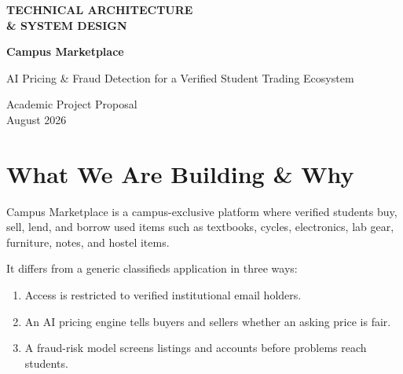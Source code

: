 \documentclass[11pt,a4paper]{article}
\begin{document}
\begin{titlepage}
    \centering
    \vspace*{2cm}
    {\Huge\bfseries\color{primary} TECHNICAL ARCHITECTURE\\[0.2cm]
    \& SYSTEM DESIGN\par}
    \vspace{1cm}
    {\LARGE\bfseries Campus Marketplace\par}
    \vspace{0.5cm}
    {\Large AI Pricing \& Fraud Detection for a Verified Student Trading Ecosystem\par}
    \vspace{1.2cm}


    \vfill
    {\large Academic Project Proposal\\August 2026\par}
\end{titlepage}

\tableofcontents
\newpage

\section{What We Are Building \& Why}

Campus Marketplace is a campus-exclusive platform where verified students buy, sell, lend, and borrow used items such as textbooks, cycles, electronics, lab gear, furniture, notes, and hostel items.

It differs from a generic classifieds application in three ways:
\begin{enumerate}
    \item Access is restricted to verified institutional email holders.
    \item An AI pricing engine tells buyers and sellers whether an asking price is fair.
    \item A fraud-risk model screens listings and accounts before problems reach students.
\end{enumerate}
\end{document}
